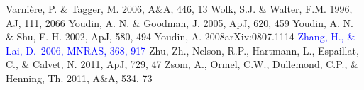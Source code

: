 \documentclass[apj]{emulateapj}
\def\blue#1{\textcolor{blue}{#1}}
\begin{document}
\begin{thebibliography}{}
 Varni\`ere, P. \& Tagger, M. 2006, A\&A, 446, 13
 Wolk, S.J. \& Walter, F.M. 1996, AJ, 111, 2066
 Youdin, A. N. \& Goodman, J. 2005, ApJ, 620, 459
 Youdin, A. N. \& Shu, F. H. 2002, ApJ, 580, 494
 Youdin, A. 2008arXiv:0807.1114
\blue{ Zhang, H., \& Lai, D.\ 2006, MNRAS, 368, 917}
 Zhu, Zh., Nelson, R.P., Hartmann, L.,  Espaillat, C., \& Calvet, N. 2011, ApJ, 729, 47
 Zsom, A., Ormel, C.W., Dullemond, C.P., \& Henning, Th. 2011, A\&A, 534, 73
\end{thebibliography}
\end{document}
